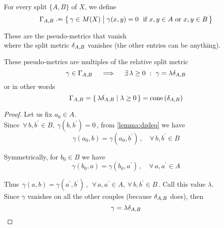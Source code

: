 \documentclass[./main.tex]{subfiles}
\begin{document}
\begin{notation}
    For every split $\{A,B\}$ of $X$, we define
    \[ \Gamma_{A,B} \defeq \bigl\{\, \gamma \in M(X) \mathrel{\big|} \gamma(x,y) = 0\ \ \text{if}\ x,y \in A\ \text{or}\ x,y \in B \,\bigr\} \nospblw \]
\end{notation}
These are the pseudo-metrics that vanish \\
\bsp where the split metric $\delta_{A,B}$ vanishes (the other entries can be anything).

\begin{lemma} \label{lemma:extray}
    These pseudo-metrics are multiples of the relative split metric
    \[ \gamma \in \Gamma_{A,B} \quad \implies \quad \exists\, \lambda \geq 0\ :\ \gamma = \lambda \delta_{A,B} \]
    or in other words
    \[ \Gamma_{A,B} = \{\, \lambda \dAB \mathrel{|} \lambda \geq 0 \,\} = \mathrm{cone}\, (\dAB) \nospblw \]
\end{lemma}\vspace{-\baselineskip}
\begin{proof}
    Let us fix $a_0 \in A$. \\
    Since $\, \forall\, b,b^\prime \in B,\ \gamma(b,b^\prime) = 0 \,$, from \autoref{lemma:dzdeq} we have
    \[ \gamma(a_0,b) = \gamma(a_0,b^\prime) \,, \quad \forall\, b,b^\prime \in B \]

    Symmetrically, for $b_0 \in B$ we have
    \[ \gamma(b_0,a) = \gamma(b_0,a^\prime) \,, \quad \forall\, a,a^\prime \in A \]

    Thus $\, \gamma(a,b) = \gamma(a^\prime,b^\prime) \,,\ \ \forall\, a,a^\prime \in A,\ \forall\, b,b^\prime \in B \,$. Call this value $\lambda$. \\
    Since $\gamma$ vanishes on all the other couples (because $\delta_{A,B}$ does), then
    \[ \gamma = \lambda \dAB \nospblw \qedhere \]
\end{proof}
\end{document}
